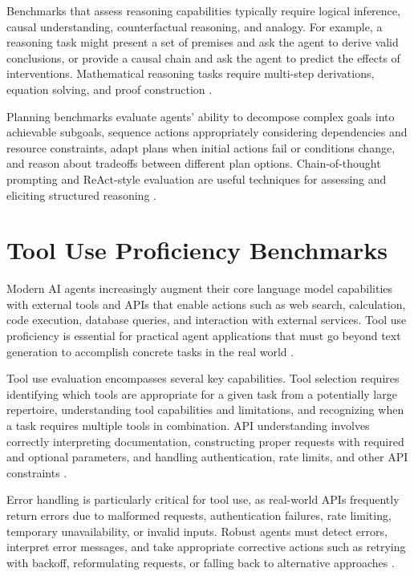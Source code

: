 \begin{TNtwocol}
Benchmarks that assess reasoning capabilities typically require logical inference, causal understanding, counterfactual reasoning, and analogy. For example, a reasoning task might present a set of premises and ask the agent to derive valid conclusions, or provide a causal chain and ask the agent to predict the effects of interventions. Mathematical reasoning tasks require multi-step derivations, equation solving, and proof construction \cite{valmeekam2023,wei2022}.

Planning benchmarks evaluate agents' ability to decompose complex goals into achievable subgoals, sequence actions appropriately considering dependencies and resource constraints, adapt plans when initial actions fail or conditions change, and reason about tradeoffs between different plan options. Chain-of-thought prompting and ReAct-style evaluation are useful techniques for assessing and eliciting structured reasoning \cite{wei2022,yao2023}.

\section{Tool Use Proficiency Benchmarks}
Modern AI agents increasingly augment their core language model capabilities with external tools and APIs that enable actions such as web search, calculation, code execution, database queries, and interaction with external services. Tool use proficiency is essential for practical agent applications that must go beyond text generation to accomplish concrete tasks in the real world \cite{putta2024,qin2024}.

Tool use evaluation encompasses several key capabilities. Tool selection requires identifying which tools are appropriate for a given task from a potentially large repertoire, understanding tool capabilities and limitations, and recognizing when a task requires multiple tools in combination. API understanding involves correctly interpreting documentation, constructing proper requests with required and optional parameters, and handling authentication, rate limits, and other API constraints \cite{putta2024,qin2024}.

Error handling is particularly critical for tool use, as real-world APIs frequently return errors due to malformed requests, authentication failures, rate limiting, temporary unavailability, or invalid inputs. Robust agents must detect errors, interpret error messages, and take appropriate corrective actions such as retrying with backoff, reformulating requests, or falling back to alternative approaches \cite{putta2024}.


\end{TNtwocol}
